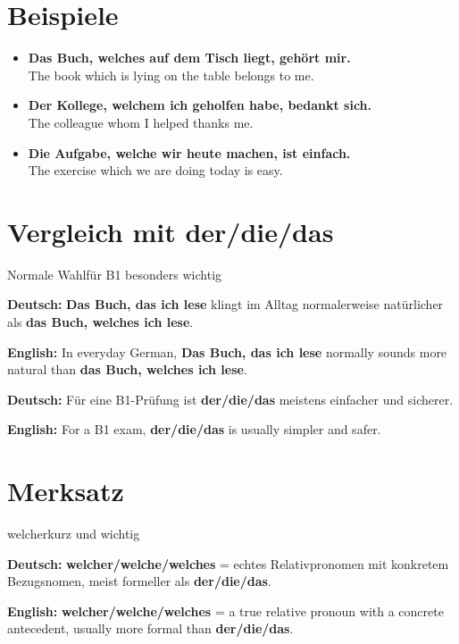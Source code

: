 \documentclass[a4paper,11pt]{article}
\newcommand{\GermanText}[1]{\textbf{Deutsch: }#1\par}
\newcommand{\EnglishText}[1]{{\small\color{SoftGray}\textbf{English: }#1\par}}
\newcommand{\ExampleItem}[2]{\item \textbf{#1}\\{\small\color{SoftGray}#2}}
\begin{document}
\section{Beispiele}

\begin{exbox}

\begin{itemize}

\ExampleItem{Das Buch, welches auf dem Tisch liegt, gehört mir.}{The book which is lying on the table belongs to me.}

\ExampleItem{Der Kollege, welchem ich geholfen habe, bedankt sich.}{The colleague whom I helped thanks me.}

\ExampleItem{Die Aufgabe, welche wir heute machen, ist einfach.}{The exercise which we are doing today is easy.}

\end{itemize}

\end{exbox}

\section{Vergleich mit der/die/das}

\begin{grammarentry}{Normale Wahl}{für B1 besonders wichtig}

\GermanText{\textbf{Das Buch, das ich lese} klingt im Alltag normalerweise natürlicher als \textbf{das Buch, welches ich lese}.}

\EnglishText{In everyday German, \textbf{Das Buch, das ich lese} normally sounds more natural than \textbf{das Buch, welches ich lese}.}

\GermanText{Für eine B1-Prüfung ist \textbf{der/die/das} meistens einfacher und sicherer.}

\EnglishText{For a B1 exam, \textbf{der/die/das} is usually simpler and safer.}

\end{grammarentry}

\section{Merksatz}

\begin{grammarentry}{welcher}{kurz und wichtig}

\GermanText{\textbf{welcher/welche/welches} = echtes Relativpronomen mit konkretem Bezugsnomen, meist formeller als \textbf{der/die/das}.}

\EnglishText{\textbf{welcher/welche/welches} = a true relative pronoun with a concrete antecedent, usually more formal than \textbf{der/die/das}.}

\end{grammarentry}
\end{document}
